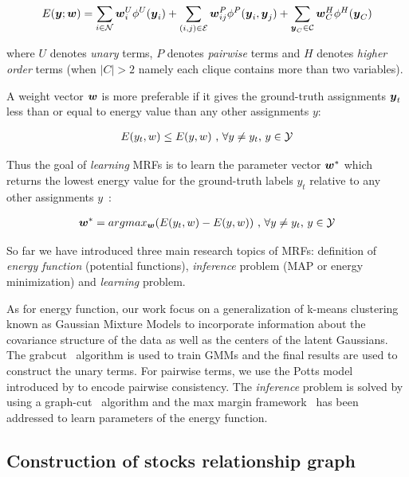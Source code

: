 \begin{align}
  \label{eq:energyfunction_UPH}
  E({\boldsymbol{y}};{\boldsymbol{w}})=\sum_{i\in {\cal N}}{{\boldsymbol{w}}_i^U\phi^U({\boldsymbol{y}}_i)}+
  \sum_{(i,j)\in {\cal E}}{{\boldsymbol{w}}_{ij}^P\phi^P({\boldsymbol{y}}_i,{\boldsymbol{y}}_j)}+
  \sum_{{\boldsymbol{y}}_C\in {\cal C}}{{\boldsymbol{w}}_C^H\phi^H({\boldsymbol{y}}_C)}
\end{align}

\noindent where $U$ denotes \emph{unary} terms, $P$ denotes
\emph{pairwise} terms and $H$ denotes \emph{higher order} terms
(when $|C|>2$ namely each clique contains more than two
variables).

A weight vector ${\boldsymbol{w}}$ is more preferable if it gives the
ground-truth assignments ${\boldsymbol{y}}_t$ less than or equal to energy
value than any other assignments $y$:

\begin{align}
E(y_t,w)\leq E(y,w)~ \text{,~}\forall y \neq y_t
\text{,~} y\in {\cal Y}
\end{align}


Thus the goal of \emph{learning} MRFs is to learn the parameter
vector ${\boldsymbol{w}}^*$ which returns the lowest energy value for the
ground-truth labels $y_t$ relative to any other assignments
$y$~\cite{Szummer:ECCV08}:

\begin{align}
{\boldsymbol{w}}^* = argmax_{{\boldsymbol{w}}}(E(y_t,w)-E(y,w))~ \text{,~}\forall y \neq y_t
\text{,~} y\in {\cal Y}
\end{align}

So far we have introduced three main research topics of MRFs:
definition of \emph{energy function} (potential functions),
\emph{inference} problem (MAP or energy minimization) and
\emph{learning} problem.

As for energy function, our work focus on a generalization of
k-means clustering known as Gaussian Mixture Models to
incorporate information about the covariance structure of the
data as well as the centers of the latent Gaussians. The
grabcut~\cite{Rother:SIGGRAPH04} algorithm is used to train GMMs
and the final results are used to construct the unary terms. For
pairwise terms, we use the Potts model introduced by
 to encode pairwise consistency. The
\emph{inference} problem is solved by using a
graph-cut~\cite{Boykov:ICCV99, Boykov:PAMI04} algorithm and the
max margin framework~\cite{tsochantaridis2005large} has been
addressed to learn parameters of the energy function.

\subsection{Construction of stocks relationship graph}
\label{sec:con_stock_graph}

